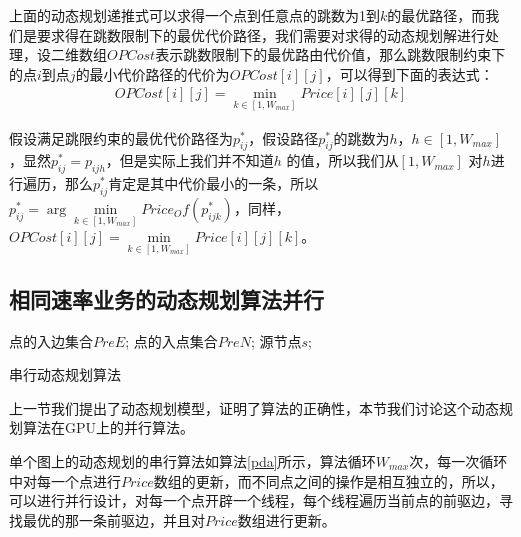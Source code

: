 上面的动态规划递推式可以求得一个点到任意点的跳数为1到$k$的最优路径，而我们是要求得在跳数限制下的最优代价路径，我们需要对求得的动态规划解进行处理，设二维数组$OPCost$表示跳数限制下的最优路由代价值，那么跳数限制约束下的点$i$到点$j$的最小代价路径的代价为$OPCost[i][j]$，可以得到下面的表达式：
\begin{equation}\label{best}
\begin{split}
OPCost[i][j]=\min\limits_{k \in [1,W_{max}]}{Price[i][j][k]}
\end{split}
\end{equation}

假设满足跳限约束的最优代价路径为$p_{ij}^*$，假设路径$p_{ij}^*$的跳数为$h$，$h \in [1,W_{max}]$，显然$p_{ij}^*=p_{ijh}$，但是实际上我们并不知道$h$ 的值，所以我们从$[1,W_{max}]$ 对$h$进行遍历，那么$p_{ij}^*$肯定是其中代价最小的一条，所以$p_{ij}^*=\arg\min\limits_{k \in [1,W_{max}]}{Price_Of(p_{ijk}^*)}$，同样，$OPCost[i][j]=\min\limits_{k \in [1,W_{max}]}{Price[i][j][k]}$。

\subsection{相同速率业务的动态规划算法并行}

\begin{algorithm}[t]
\begin{algorithmic}[1]
\Require
点的入边集合$PreE$;
点的入点集合$PreN$;
源节点$s$;
\EndFor
\EndFor
\end{algorithmic}
\caption{{串行动态规划算法}}
\label{pda}
\end{algorithm}

上一节我们提出了动态规划模型，证明了算法的正确性，本节我们讨论这个动态规划算法在GPU上的并行算法。

单个图上的动态规划的串行算法如算法\ref{pda}所示，算法循环$W_{max}$次，每一次循环中对每一个点进行$Price$数组的更新，而不同点之间的操作是相互独立的，所以，可以进行并行设计，对每一个点开辟一个线程，每个线程遍历当前点的前驱边，寻找最优的那一条前驱边，并且对$Price$数组进行更新。

